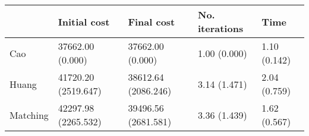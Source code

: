 \begin{tabular}{lllll}
\toprule
{} &         Initial cost &           Final cost & No. iterations &          Time \\
\midrule
Cao      &     37662.00 (0.000) &     37662.00 (0.000) &   1.00 (0.000) &  1.10 (0.142) \\
Huang    &  41720.20 (2519.647) &  38612.64 (2086.246) &   3.14 (1.471) &  2.04 (0.759) \\
Matching &  42297.98 (2265.532) &  39496.56 (2681.581) &   3.36 (1.439) &  1.62 (0.567) \\
\bottomrule
\end{tabular}
